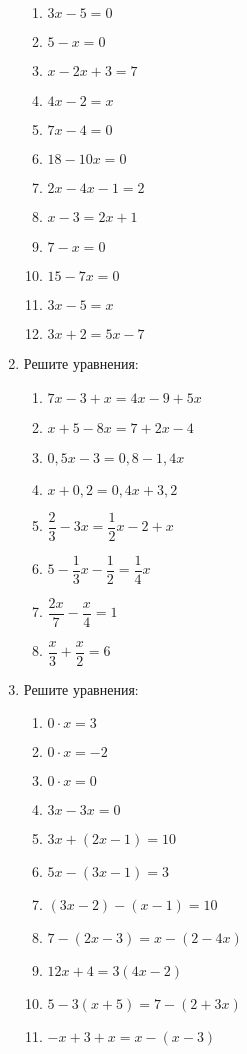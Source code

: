 \documentclass[10pt, a4paper]{article}
\begin{document}
\begin{enumerate}
\begin{multicols}{3}
\begin{enumerate}[label=\asbuk*)]
			\item $3x-5=0$
			\item $5-x=0$
			\item $x-2x+3=7$
			\item $4x-2=x$
			\item $7x-4=0$
			\item $18-10x=0$
			\item $2x-4x-1=2$
			\item $x-3=2x+1$
			\item $7-x=0$
			\item $15-7x=0$
			\item $3x-5=x$
			\item $3x+2=5x-7$
		\end{enumerate}
	\end{multicols}
	\item Решите уравнения:
	\begin{multicols}{2}
		\begin{enumerate}[label=\asbuk*)]
			\item $7x-3+x=4x-9+5x$
			\item $x+5-8x=7+2x-4$
			\item $0,5x-3=0,8-1,4x$
			\item $x+0,2=0,4x+3,2$
			\item $\dfrac{2}{3}-3x=\dfrac{1}{2}x-2+x$
			\item $5-\dfrac{1}{3}x-\dfrac{1}{2}=\dfrac{1}{4}x$
			\item $\dfrac{2x}{7}-\dfrac{x}{4}=1$
			\item $\dfrac{x}{3}+\dfrac{x}{2}=6$
		\end{enumerate}
	\end{multicols}
	\item Решите уравнения:
	\begin{multicols}{2}
		\begin{enumerate}[label=\asbuk*)]
			\item $0\cdot x = 3$
			\item $0\cdot x = -2$
			\item $0\cdot x = 0$
			\item $3x-3x=0$
			\item $3x+(2x-1)=10$
			\item $5x-(3x-1)=3$
			\item $(3x-2)-(x-1)=10$
			\item $7-(2x-3)=x-(2-4x)$
			\item $12x+4=3(4x-2)$
			\item $5-3(x+5)=7-(2+3x)$
			\item $-x+3+x=x-(x-3)$

\end{enumerate}
\end{multicols}
\end{enumerate}
\end{document}
